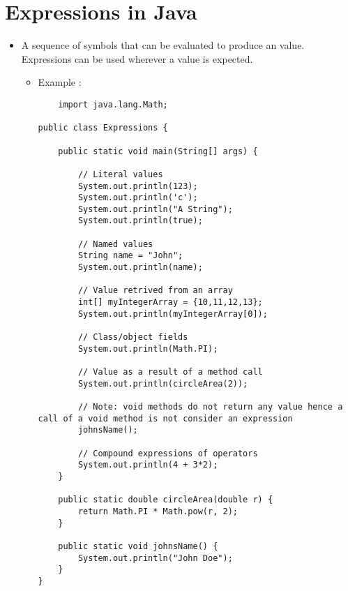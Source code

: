 \documentclass{article}
\begin{document}
\section{Expressions in Java}
\begin{itemize}

\item A sequence of symbols that can be evaluated to produce an value. Expressions can be used wherever a value is expected.
\newpage
\begin{itemize}
    \item Example :
    \begin{lstlisting}
    import java.lang.Math;

public class Expressions {

    public static void main(String[] args) {
        
        // Literal values
        System.out.println(123);
        System.out.println('c');
        System.out.println("A String");
        System.out.println(true);

        // Named values
        String name = "John";
        System.out.println(name);

        // Value retrived from an array
        int[] myIntegerArray = {10,11,12,13};
        System.out.println(myIntegerArray[0]);

        // Class/object fields
        System.out.println(Math.PI);

        // Value as a result of a method call
        System.out.println(circleArea(2));

        // Note: void methods do not return any value hence a call of a void method is not consider an expression
        johnsName();

        // Compound expressions of operators
        System.out.println(4 + 3*2);
    }

    public static double circleArea(double r) {
        return Math.PI * Math.pow(r, 2);
    }

    public static void johnsName() {
        System.out.println("John Doe");
    }
}
    \end{lstlisting}
\end{itemize}

\end{itemize}
\end{document}
